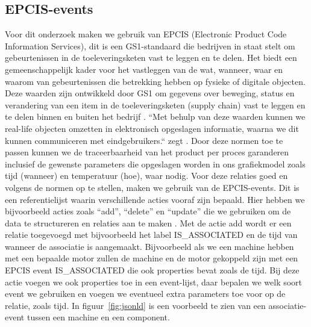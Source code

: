 \subsection{EPCIS-events}
Voor dit onderzoek maken we gebruik van EPCIS (Electronic Product Code Information Services), dit is een GS1-standaard die bedrijven in staat stelt om gebeurtenissen in de toeleveringsketen vast te leggen en te delen. 
Het biedt een gemeenschappelijk kader voor het vastleggen van de wat, wanneer, waar en waarom van gebeurtenissen die betrekking hebben op fysieke of digitale objecten. 
Deze waarden zijn ontwikkeld door GS1 om gegevens over beweging, status en verandering van een item in de toeleveringsketen (supply chain) vast te leggen en te delen binnen en buiten het bedrijf \autocite{Devins}.
``Met behulp van deze waarden kunnen we real-life objecten omzetten in elektronisch opgeslagen informatie, waarna we dit kunnen communiceren met eindgebruikers.`` zegt \textcite{Devins}.
Door deze normen toe te passen kunnen we de traceerbaarheid van het product per proces garanderen inclusief de gewenste parameters die opgeslagen worden in ons grafiekmodel zoals tijd (wanneer) en temperatuur (hoe), waar nodig.
Voor deze relaties goed en volgens de normen op te stellen, maken we gebruik van de EPCIS-events. Dit is een referentielijst waarin verschillende acties vooraf zijn bepaald.
Hier hebben we bijvoorbeeld acties zoals ``add'', ``delete'' en ``update'' die we gebruiken om de data te structureren en relaties aan te maken \autocite{Byun2020}.
Met de actie add wordt er een relatie toegevoegd met bijvoorbeeld het label IS\_ASSOCIATED en de tijd van wanneer de associatie is aangemaakt.
Bijvoorbeeld als we een machine hebben met een bepaalde motor zullen de machine en de motor gekoppeld zijn met een EPCIS event IS\_ASSOCIATED die ook properties bevat zoals de tijd.
Bij deze actie voegen we ook properties toe in een event-lijst, daar bepalen we welk soort event we gebruiken en voegen we eventueel extra parameters toe voor op de relatie, zoals tijd.
In figuur~\ref{fig:jsonld} is een voorbeeld te zien van een associatie-event tussen een machine en een component.

